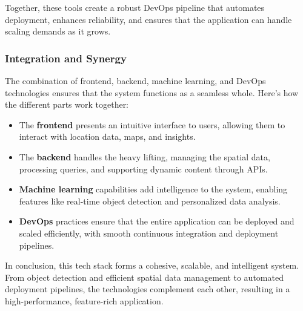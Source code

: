 Together, these tools create a robust DevOps pipeline that automates deployment, enhances reliability, and ensures that the application can handle scaling demands as it grows.

\subsubsection{Integration and Synergy}

The combination of frontend, backend, machine learning, and DevOps technologies ensures that the system functions as a seamless whole. Here's how the different parts work together:

\begin{itemize}
    \item{} The \textbf{frontend} presents an intuitive interface to users, allowing them to interact with location data, maps, and insights.
    \item{} The \textbf{backend} handles the heavy lifting, managing the spatial data, processing queries, and supporting dynamic content through APIs.
    \item{} \textbf{Machine learning} capabilities add intelligence to the system, enabling features like real{-}time object detection and personalized data analysis.
    \item{} \textbf{DevOps} practices ensure that the entire application can be deployed and scaled efficiently, with smooth continuous integration and deployment pipelines.
\end{itemize}

In conclusion, this tech stack forms a cohesive, scalable, and intelligent system. From object detection and efficient spatial data management to automated deployment pipelines, the technologies complement each other, resulting in a high{-}performance, feature{-}rich application.

\newpage{}